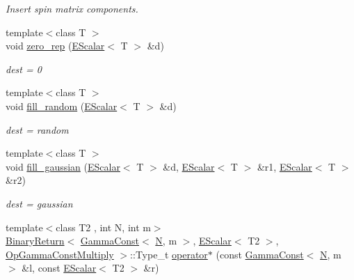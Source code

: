 \begin{DoxyCompactItemize}
\begin{DoxyCompactList}\small\item\em Insert spin matrix components. \end{DoxyCompactList}\item 
{\footnotesize template$<$class T $>$ }\\void \mbox{\hyperlink{group__escalar_gacea96299b1b52d3a75cdb109c3b03b05}{zero\+\_\+rep}} (\mbox{\hyperlink{classENSEM_1_1EScalar}{E\+Scalar}}$<$ T $>$ \&d)
\begin{DoxyCompactList}\small\item\em dest = 0 \end{DoxyCompactList}\item 
{\footnotesize template$<$class T $>$ }\\void \mbox{\hyperlink{group__escalar_gab876765eed1c2ac8b1d1adcf0b0ba123}{fill\+\_\+random}} (\mbox{\hyperlink{classENSEM_1_1EScalar}{E\+Scalar}}$<$ T $>$ \&d)
\begin{DoxyCompactList}\small\item\em dest = random \end{DoxyCompactList}\item 
{\footnotesize template$<$class T $>$ }\\void \mbox{\hyperlink{group__escalar_ga3598759ad3e33b4008dd80a044cc75a8}{fill\+\_\+gaussian}} (\mbox{\hyperlink{classENSEM_1_1EScalar}{E\+Scalar}}$<$ T $>$ \&d, \mbox{\hyperlink{classENSEM_1_1EScalar}{E\+Scalar}}$<$ T $>$ \&r1, \mbox{\hyperlink{classENSEM_1_1EScalar}{E\+Scalar}}$<$ T $>$ \&r2)
\begin{DoxyCompactList}\small\item\em dest = gaussian \end{DoxyCompactList}\item 
{\footnotesize template$<$class T2 , int N, int m$>$ }\\\mbox{\hyperlink{structENSEM_1_1BinaryReturn}{Binary\+Return}}$<$ \mbox{\hyperlink{classENSEM_1_1GammaConst}{Gamma\+Const}}$<$ \mbox{\hyperlink{operator__name__util_8cc_a7722c8ecbb62d99aee7ce68b1752f337}{N}}, m $>$, \mbox{\hyperlink{classENSEM_1_1EScalar}{E\+Scalar}}$<$ T2 $>$, \mbox{\hyperlink{structENSEM_1_1OpGammaConstMultiply}{Op\+Gamma\+Const\+Multiply}} $>$\+::Type\+\_\+t \mbox{\hyperlink{group__escalar_gae8dabaf2e8ff409632f9943294b5a6b4}{operator$\ast$}} (const \mbox{\hyperlink{classENSEM_1_1GammaConst}{Gamma\+Const}}$<$ \mbox{\hyperlink{operator__name__util_8cc_a7722c8ecbb62d99aee7ce68b1752f337}{N}}, m $>$ \&l, const \mbox{\hyperlink{classENSEM_1_1EScalar}{E\+Scalar}}$<$ T2 $>$ \&r)

\end{DoxyCompactItemize}
